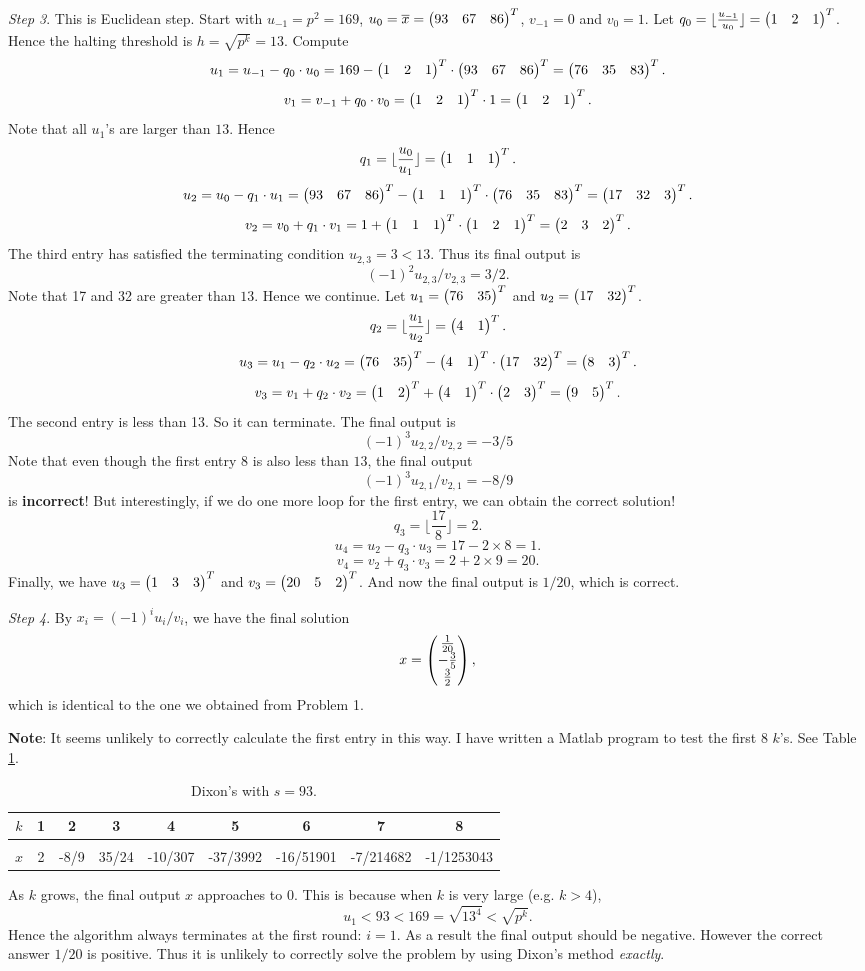 \documentclass[12pt]{article}
\theoremstyle{plain}
\begin{document}
\emph{Step 3}. This is Euclidean step. Start with $u_{-1} = p^2 = 169$, $u_0=\overline{x} = \begin{pmatrix}93 & 67 & 86\end{pmatrix}^T$, $v_{-1} = 0$ and $v_0=1$. Let $q_0 = \lfloor \frac{u_{-1}}{u_0} \rfloor = \begin{pmatrix}1 & 2 & 1\end{pmatrix}^T$. Hence the halting threshold is $h = \sqrt{p^k} = 13$. Compute
$$u_1 = u_{-1} - q_0\cdot u_0 = 169 - \begin{pmatrix}1 & 2 & 1\end{pmatrix}^T \cdot \begin{pmatrix}93 & 67 & 86\end{pmatrix}^T = \begin{pmatrix}76 & 35 & 83\end{pmatrix}^T.$$
$$v_1 = v_{-1} + q_0\cdot v_0 = \begin{pmatrix}1 & 2 & 1\end{pmatrix}^T \cdot 1 = \begin{pmatrix}1 & 2 & 1\end{pmatrix}^T.$$
Note that all $u_1$'s are larger than $13$. Hence
$$q_1 = \lfloor \frac{u_0}{u_1} \rfloor = \begin{pmatrix}1 & 1 & 1\end{pmatrix}^T.$$
$$u_2 = u_0 - q_1\cdot u_1 = \begin{pmatrix}93 & 67 & 86\end{pmatrix}^T - \begin{pmatrix}1 & 1 & 1\end{pmatrix}^T \cdot \begin{pmatrix}76 & 35 & 83\end{pmatrix}^T = \begin{pmatrix}17 & 32 & 3\end{pmatrix}^T.$$
$$v_2 = v_0 + q_1\cdot v_1 = 1 + \begin{pmatrix}1 & 1 & 1\end{pmatrix}^T \cdot \begin{pmatrix}1 & 2 & 1\end{pmatrix}^T = \begin{pmatrix}2&3&2\end{pmatrix}^T.$$
The third entry has satisfied the terminating condition $u_{2,3} = 3 < 13$. Thus its final output is 
$$(-1)^2u_{2,3}/v_{2,3} = 3/2.$$
Note that 17 and 32 are greater than $13$. Hence we continue. Let $u_1 = \begin{pmatrix}76 & 35\end{pmatrix}^T$ and $u_2 = \begin{pmatrix}17 & 32\end{pmatrix}^T$.
$$q_2 = \lfloor \frac{u_1}{u_2} \rfloor = \begin{pmatrix}4 & 1\end{pmatrix}^T.$$
$$u_3 = u_1 - q_2\cdot u_2 = \begin{pmatrix}76 & 35\end{pmatrix}^T - \begin{pmatrix}4 & 1\end{pmatrix}^T \cdot \begin{pmatrix}17 & 32\end{pmatrix}^T = \begin{pmatrix}8 & 3\end{pmatrix}^T.$$
$$v_3 = v_1 + q_2\cdot v_2 = \begin{pmatrix}1 & 2\end{pmatrix}^T + \begin{pmatrix}4 & 1\end{pmatrix}^T \cdot \begin{pmatrix}2&3\end{pmatrix}^T = \begin{pmatrix}9 & 5\end{pmatrix}^T.$$
The second entry is less than 13. So it can terminate. The final output is 
$$(-1)^3u_{2,2}/v_{2,2} = -3/5$$
Note that even though the first entry 8 is also less than $13$, the final output 
$$(-1)^3u_{2,1}/v_{2,1} = -8/9$$
 is {\bf incorrect}!
But interestingly, if we do one more loop for the first entry, we can obtain the correct solution!
$$q_3 = \lfloor \frac{17}{8} \rfloor = 2.$$
$$u_4 = u_2 - q_3\cdot u_3 = 17 - 2\times 8 = 1.$$
$$v_4 = v_2 + q_3\cdot v_3 = 2 + 2\times 9 = 20.$$
Finally, we have $u_3=\begin{pmatrix}1 & 3 & 3\end{pmatrix}^T$ and $v_3 = \begin{pmatrix}20 & 5 & 2\end{pmatrix}^T$. 
And now the final output is $1/20$, which is correct.

\emph{Step 4}. By $x_i = (-1)^i u_i/v_i$, we have the final solution
$$x = \begin{pmatrix}\frac{1}{20} \\ -\frac{3}{5} \\ \frac{3}{2}\end{pmatrix},$$
which is identical to the one we obtained from Problem 1.

{\bf Note}: It seems unlikely to correctly calculate the first entry in this way. I have written a Matlab program to test the first 8 $k$'s. See Table \ref{tab:1}.
\begin{table}
\caption{Dixon's with $s=93$.}
\begin{tabular}{c | c c c c c c c c}
$k$ & 1 & 2 & 3 & 4 & 5 & 6 & 7 & 8\\
\hline\\
$x$ & 2 & -8/9 & 35/24 & -10/307 & -37/3992 & -16/51901 & -7/214682 & -1/1253043 \\
\end{tabular}
\label{tab:1}
\end{table}
As $k$ grows, the final output $x$ approaches to 0. This is because when $k$ is very large (e.g. $k>4$), 
$$u_1 < 93 < 169 = \sqrt{13^4} < \sqrt{p^k}.$$
Hence the algorithm always terminates at the first round: $i=1$. As a result the final output should be negative. However the correct answer $1/20$ is positive. Thus it is unlikely to correctly solve the problem by using Dixon's method \emph{exactly}.
\end{document}
